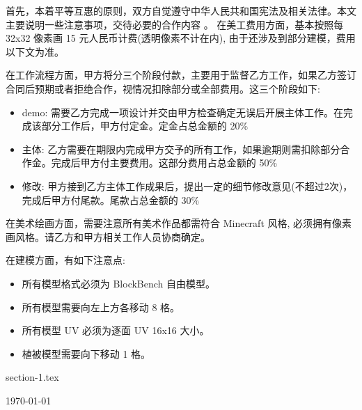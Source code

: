 \documentclass{TMR}
\begin{document}
\begin{coverletter}

\hspace{2em} 首先，本着平等互惠的原则，双方自觉遵守中华人民共和国宪法及相关法律。本文主要说明一些注意事项，交待必要的合作内容
。
\hspace{2em} 在美工费用方面，基本按照每 32x32 像素画 15 元人民币计费(透明像素不计在内), 由于还涉及到部分建模，费用以下文为准。

\hspace{2em} 在工作流程方面，甲方将分三个阶段付款，主要用于监督乙方工作，如果乙方签订合同后预期或者拒绝合作，视情况扣除部分或全部费用。这三个阶段如下:
\begin{itemize}
    \item demo: 需要乙方完成一项设计并交由甲方检查确定无误后开展主体工作。在完成该部分工作后，甲方付定金。定金占总金额的 20\%
    \item 主体: 乙方需要在期限内完成甲方交予的所有工作，如果逾期则需扣除部分合作金。完成后甲方付主要费用。这部分费用占总金额的 50\%
    \item 修改: 甲方接到乙方主体工作成果后，提出一定的细节修改意见(不超过2次)，完成后甲方付尾款。尾款占总金额的 30\%
\end{itemize}


\hspace{2em} 在美术绘画方面，需要注意所有美术作品都需符合 Minecraft 风格, 必须拥有像素画风格。请乙方和甲方相关工作人员协商确定。

\hspace{2em} 在建模方面，有如下注意点:
\begin{itemize}
    \item 所有模型格式必须为 BlockBench 自由模型。
    \item 所有模型需要向左上方各移动 8 格。
    \item 所有模型 UV 必须为逐面 UV 16x16 大小。
    \item 植被模型需要向下移动 1 格。
\end{itemize}

\end{coverletter}


\begin{resume}

{section-1.tex}

\today

\end{resume}
\end{document}
